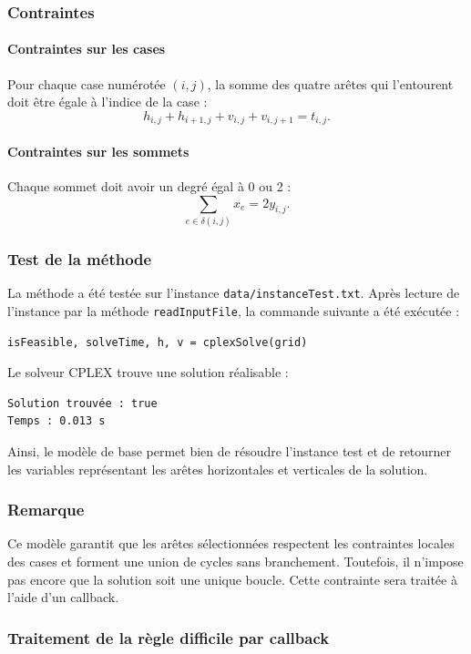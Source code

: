 \subsubsection{Contraintes}

\paragraph{Contraintes sur les cases}
Pour chaque case numérotée \((i,j)\), la somme des quatre arêtes qui l'entourent doit être égale à l'indice de la case :
\[
h_{i,j} + h_{i+1,j} + v_{i,j} + v_{i,j+1} = t_{i,j}.
\]

\paragraph{Contraintes sur les sommets}
Chaque sommet doit avoir un degré égal à 0 ou 2 :
\[
\sum_{e \in \delta(i,j)} x_e = 2y_{i,j}.
\]

\subsubsection{Test de la méthode}

La méthode a été testée sur l'instance \texttt{data/instanceTest.txt}. Après lecture de l'instance par la méthode \texttt{readInputFile}, la commande suivante a été exécutée :
\begin{verbatim}
isFeasible, solveTime, h, v = cplexSolve(grid)
\end{verbatim}

Le solveur CPLEX trouve une solution réalisable :
\begin{verbatim}
Solution trouvée : true
Temps : 0.013 s
\end{verbatim}

Ainsi, le modèle de base permet bien de résoudre l'instance test et de retourner les variables représentant les arêtes horizontales et verticales de la solution.

\subsubsection{Remarque}

Ce modèle garantit que les arêtes sélectionnées respectent les contraintes locales des cases et forment une union de cycles sans branchement. Toutefois, il n'impose pas encore que la solution soit une unique boucle. Cette contrainte sera traitée à l'aide d'un callback.

\subsubsection{Traitement de la règle difficile par callback}

